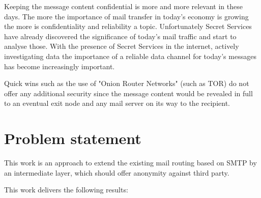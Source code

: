 Keeping the message content confidential is more and more relevant in these days. The more the importance of mail transfer in today's economy is growing the more is confidentiality and reliability a topic. Unfortunately Secret Services have already discovered the significance of today's mail traffic and start to analyse those. With the presence of Secret Services in the internet, actively investigating data the importance of a reliable data channel for today's messages has become increasingly important. 

Quick wins such as the use of "Onion Router Networks" (such as TOR) do not offer any additional security since the message content would be revealed in full to an eventual exit node and any mail server on its way to the recipient.

\section{Problem statement}
This work is an approach to extend the existing mail routing based on SMTP by an intermediate layer, which should offer anonymity against third party.\par

This work delivers the following results:

